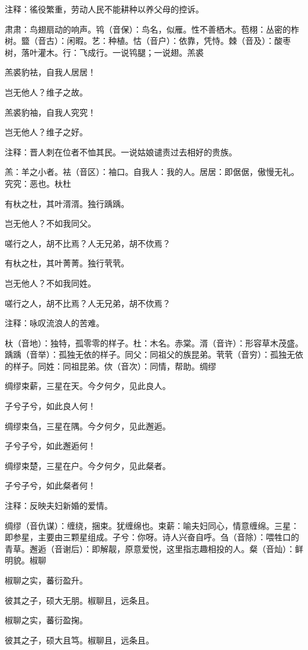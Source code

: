 \documentclass[12pt,UTF8]{ctexbook}
\begin{document}
注释：徭役繁重，劳动人民不能耕种以养父母的控诉。

肃肃：鸟翅扇动的响声。鸨（音保）：鸟名，似雁。性不善栖木。苞栩：丛密的柞树。盬（音古）：闲暇。艺：种植。怙（音户）：依靠，凭恃。棘（音及）：酸枣树，落叶灌木。行：飞成行。一说鸨腿；一说翅。羔裘

羔裘豹袪，自我人居居！

岂无他人？维子之故。

羔裘豹袖，自我人究究！

岂无他人？维子之好。

注释：晋人刺在位者不恤其民。一说姑娘谴责过去相好的贵族。

羔：羊之小者。袪（音区）：袖口。自我人：我的人。居居：即倨倨，傲慢无礼。究究：恶也。杕杜

有杕之杜，其叶湑湑。独行踽踽。

岂无他人？不如我同父。

嗟行之人，胡不比焉？人无兄弟，胡不佽焉？

有杕之杜，其叶菁菁。独行茕茕。

岂无他人？不如我同姓。

嗟行之人，胡不比焉？人无兄弟，胡不佽焉？

注释：咏叹流浪人的苦难。

杕（音地）：独特，孤零零的样子。杜：木名。赤棠。湑（音许）：形容草木茂盛。踽踽（音举）：孤独无依的样子。同父：同祖父的族昆弟。茕茕（音穷）：孤独无依的样子。同姓：同祖昆弟。佽（音次）：同情，帮助。绸缪

绸缪束薪，三星在天。今夕何夕，见此良人。

子兮子兮，如此良人何！

绸缪束刍，三星在隅。今夕何夕，见此邂逅。

子兮子兮，如此邂逅何！

绸缪束楚，三星在户。今夕何夕，见此粲者。

子兮子兮，如此粲者何！

注释：反映夫妇新婚的爱情。

绸缪（音仇谋）：缠绕，捆束。犹缠绵也。束薪：喻夫妇同心，情意缠绵。三星：即参星，主要由三颗星组成。子兮：你呀。诗人兴奋自呼。刍（音除）：喂牲口的青草。邂逅（音谢后）：即解靓，原意爱悦，这里指志趣相投的人。粲（音灿）：鲜明貌。椒聊

椒聊之实，蕃衍盈升。

彼其之子，硕大无朋。椒聊且，远条且。

椒聊之实，蕃衍盈掬。

彼其之子，硕大且笃。椒聊且，远条且。
\end{document}
